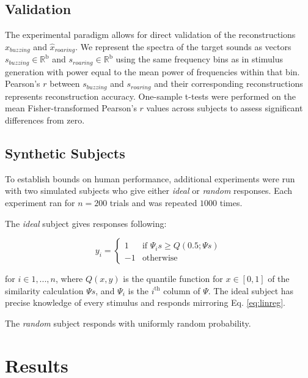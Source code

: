\documentclass[journal]{IEEEtran}
\begin{document}
\subsection{Validation}

The experimental paradigm allows for direct validation of the reconstructions $\hat{x}_{buzzing}$ and $\hat{x}_{roaring}$.
We represent the spectra of the target sounds as vectors $s_{buzzing} \in \mathbb{R}^\mathrm{b}$ and $s_{roaring} \in \mathbb{R}^\mathrm{b}$ using the same frequency bins as in stimulus generation with power equal to the mean power of frequencies within that bin.
Pearson's $r$ between $s_{buzzing}$ and $s_{roaring}$ and their corresponding reconstructions represents reconstruction accuracy.
One-sample t-tests were performed on the mean Fisher-transformed Pearson's $r$ values across subjects to assess significant differences from zero.

\subsection{Synthetic Subjects}

To establish bounds on human performance,
additional experiments were run with two simulated subjects who give either \textit{ideal} or \textit{random} responses.
Each experiment ran for $n=200$ trials and was repeated $1000$ times.

The \textit{ideal} subject gives responses following:

\begin{equation}
    y_i =
        \begin{cases}
            1 & \text{if } \Psi_i s \geq Q(0.5; \Psi s) \\
            -1 & \text{otherwise}
        \end{cases}
\end{equation}

for $i \in 1, ..., n$, where $Q(x, y)$ is the quantile function for $x \in [0, 1]$ of the similarity calculation $\Psi s$, and
$\Psi_i$ is the $i^\mathrm{th}$ column of $\Psi$.
The ideal subject has precise knowledge of every stimulus and responds mirroring Eq. \ref{eq:linreg}.

The \textit{random} subject responds with uniformly random probability.

\section{Results}
\end{document}
